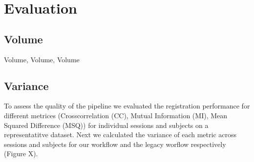\section{Evaluation}


\subsection{Volume}

Volume, Volume, Volume

\subsection{Variance}


To assess the quality of the pipeline we evaluated the registration performance for different metrices (Crosscorrelation (CC), Mutual Information (MI), Mean Squared Difference (MSQ)) for individual sessions and subjects on a representatitve dataset. Next we calculated the variance of each metric across sessions and subjects for our workflow and the legacy worflow respectively (Figure X). 
